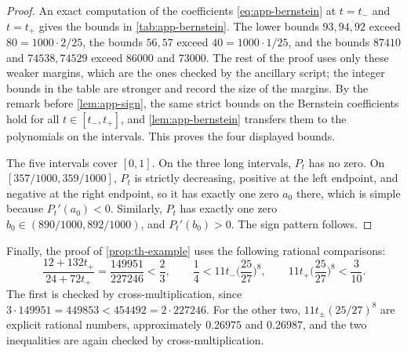 \begin{proof}
An exact computation of the coefficients \eqref{eq:app-bernstein} at $t=t_-$ and $t=t_+$ gives the bounds in \cref{tab:app-bernstein}. The lower bounds $93,94,92$ exceed $80=1000\cdot2/25$, the bounds $56,57$ exceed $40=1000\cdot1/25$, and the bounds $87410$ and $74538,74529$ exceed $86000$ and $73000$. The rest of the proof uses only these weaker margins, which are the ones checked by the ancillary script; the integer bounds in the table are stronger and record the size of the margins. By the remark before \cref{lem:app-sign}, the same strict bounds on the Bernstein coefficients hold for all $t\in[t_-,t_+]$, and \cref{lem:app-bernstein} transfers them to the polynomials on the intervals. This proves the four displayed bounds.

The five intervals cover $[0,1]$. On the three long intervals, $P_t$ has no zero. On $[357/1000,359/1000]$, $P_t$ is strictly decreasing, positive at the left endpoint, and negative at the right endpoint, so it has exactly one zero $a_0$ there, which is simple because $P_t'(a_0)<0$. Similarly, $P_t$ has exactly one zero $b_0\in(890/1000,892/1000)$, and $P_t'(b_0)>0$. The sign pattern follows.
\end{proof}

Finally, the proof of \cref{prop:th-example} uses the following rational comparisons:
\begin{equation}\label{eq:app-margins}
\frac{12+132t_+}{24+72t_+}=\frac{149951}{227246}<\frac23,\qquad\frac14<11t_-\Big(\frac{25}{27}\Big)^8,\qquad11t_+\Big(\frac{25}{27}\Big)^8<\frac3{10}.
\end{equation}
The first is checked by cross-multiplication, since $3\cdot149951=449853<454492=2\cdot227246$. For the other two, $11t_\pm(25/27)^8$ are explicit rational numbers, approximately $0.26975$ and $0.26987$, and the two inequalities are again checked by cross-multiplication.
